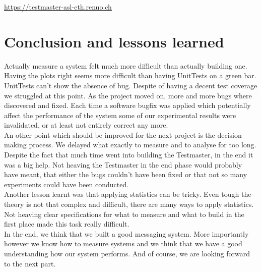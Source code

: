 \documentclass[a4paper]{article}
\begin{document}
\url{https://testmaster-asl-eth.renuo.ch}

\pagebreak

\section{Conclusion and lessons learned}

Actually measure a system felt much more difficult than actually building one. Having the plots right seems more difficult than having UnitTests on a green bar.\\

UnitTests can't show the absence of bug. Despite of having a decent test coverage we struggled at this point.  As the project moved on, more and more bugs where discovered and fixed. Each time a software bugfix was applied which potentially affect the performance of the system some of our experimental results were invalidated, or at least not entirely correct any more.\\

An other point which should be improved for the next project is the decision making process. We delayed what exactly to measure and to analyse for too long.\\

Despite the fact that much time went into building the Testmaster, in the end it was a big help. Not heaving the Testmaster in the end phase would probably have meant, that either the bugs couldn't have been fixed or that not so many experiments could have been conducted.\\

Another lesson learnt was that applying statistics can be tricky. Even tough the theory is not that complex and difficult, there are many ways to apply statistics. Not heaving clear specifications for what to measure and what to build in the first place made this task really difficult.\\

In the end, we think that we built a good messaging system. More importantly however we know how to measure systems and we think that we have a good understanding how our system performs. And of course, we are looking forward to the next part.
\end{document}
